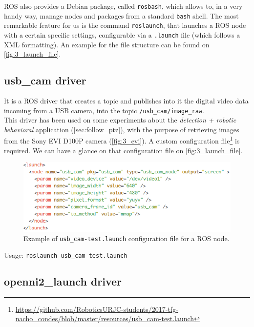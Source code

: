 	ROS also provides a Debian package, called \texttt{rosbash}, which allows to, in a very handy way, manage nodes and packages from a standard \texttt{bash} shell. The most remarkable feature for us is the command \texttt{roslaunch}, that launches a ROS node with a certain specific settings, configurable via a \texttt{.launch} file (which follows a XML formatting). An example for the file structure can be found on \autoref{fig:3_launch_file}.\\
	
	\subsection{usb\_cam driver}
	\label{sec:3_usb_cam}
		It is a ROS driver that creates a topic and publishes into it the digital video data incoming from a USB camera, into the topic \texttt{/usb\_cam/image\_raw}.\\
		
		This driver has been used on some experiments about the \emph{detection + robotic behavioral} application (\autoref{sec:follow_ptz}), with the purpose of retrieving images from the Sony EVI D100P camera (\autoref{fig:3_evi}). A custom configuration file\footnote{\url{https://github.com/RoboticsURJC-students/2017-tfg-nacho\_condes/blob/master/resources/usb\_cam-test.launch}} is required. We can have a glance on that configuration file on \autoref{fig:3_launch_file}.\\
		
		\begin{figure}[h]
			\centering
			\includegraphics[width=5in]{images/usb_cam_test}
			\caption{Example of \texttt{usb\_cam-test.launch} configuration file for a ROS node.}
			\label{fig:3_launch_file}
		\end{figure}
		\begin{center}
			Usage: \texttt{roslaunch usb\_cam-test.launch}
		\end{center}

	\subsection{openni2\_launch driver}
	
